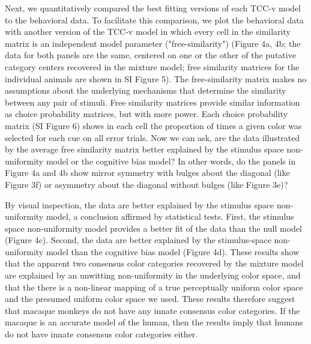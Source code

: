 Next, we quantitatively compared the best fitting versions of each TCC-v model to the behavioral data. To facilitate this comparison, we plot the behavioral data with another version of the TCC-v model in which every cell in the similarity matrix is an independent model parameter ("free-similarity") (Figure 4a, 4b; the data for both panels are the same, centered on one or the other of the putative category centers recovered in the mixture model; free similarity matrices for the individual animals are shown in SI Figure 5). The free-similarity matrix makes no assumptions about the underlying mechanisms that determine the similarity between any pair of stimuli. Free similarity matrices provide similar information as choice probability matrices, but with more power. Each choice probability matrix (SI Figure 6) shows in each cell the proportion of times a given color was selected for each cue on all error trials. Now we can ask, are the data illustrated by the average free similarity matrix better explained by the stimulus space non-uniformity model or the cognitive bias model? In other words, do the panels in Figure 4a and 4b show mirror symmetry with bulges about the diagonal (like Figure 3f) or asymmetry about the diagonal without bulges (like Figure 3e)? 

By visual inspection, the data are better explained by the stimulus space non-uniformity model, a conclusion affirmed by statistical tests. First, the stimulus space non-uniformity model provides a better fit of the data than the null model (Figure 4c). Second, the data are better explained by the stimulus-space non-uniformity model than the cognitive bias model (Figure 4d). These results show that the apparent two consensus color categories recovered by the mixture model are explained by an unwitting non-uniformity in the underlying color space, and that the there is a non-linear mapping of a true perceptually uniform color space and the presumed uniform color space we used. These results therefore suggest that macaque monkeys do not have any innate consensus color categories. If the macaque is an accurate model of the human, then the results imply that humans do not have innate consensus color categories either. 

